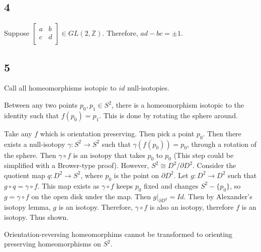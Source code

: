 \documentclass{article}
\theoremstyle{definition}
\numberwithin{theorem}{section}
\numberwithin{equation}{section}
\begin{document}
\subsection{4}
Suppose $\begin{bmatrix}
    a & b\\
    c & d\\
\end{bmatrix} \in GL(2, \mathbb{Z})$. Therefore, $ad - bc = \pm 1$.

\subsection{5}
Call all homeomorphisms isotopic to $id$ null-isotopies. 

Between any two points $p_0, p_1 \in S^2$, there is a homeomorphism isotopic to the identity such that $f(p_0) = p_1$. This is done by rotating the sphere around. 

Take any $f$ which is orientation preserving. Then pick a point $p_0$. Then there exists a null-isotopy $\gamma : S^2 \rightarrow S^2$ such that $\gamma(f(p_0)) = p_0$, through a rotation of the sphere. Then $ \gamma \circ f$ is an isotopy that takes $p_0$ to $p_0$ (This step could be simplified with a Brower-type proof). However, $S^2 \cong D^2/{\partial D^2}$. Consider the quotient map $q : D^2 \rightarrow S^2$, where $p_0$ is the point on $\partial D^2$. Let $g : D^2 \rightarrow D^2$ such that $g \circ q = \gamma \circ f$. This map exists as $\gamma \circ f$ keeps $p_0$ fixed and changes $S^2 - \{p_0\}$, so $g = \gamma \circ f$ on the open disk under the map. Then $g|_{\partial D^2} = Id$. Then by Alexander's isotopy lemma, $g$ is an isotopy. Therefore, $\gamma \circ f$ is also an isotopy, therefore $f$ is an isotopy. Thus shown. 

Orientation-reversing homeomorphims cannot be transformed to orienting preserving homeomorphisms on $S^2$. 
\end{document}
